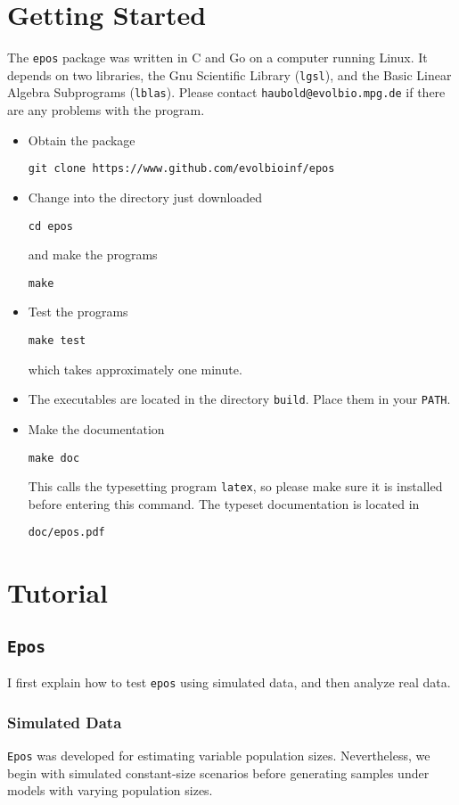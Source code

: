 \documentclass[a4paper, english]{article}
\newcommand{\bi}{\begin{itemize}}
\newcommand{\ei}{\end{itemize}}
\newcommand{\I}{\item}
\newcommand{\ty}{\texttt}
\begin{document}
\section{Getting Started}
The \ty{epos} package was written in C and Go on a computer running
Linux. It depends on
two libraries, the Gnu Scientific Library
(\ty{lgsl}), and the Basic Linear Algebra Subprograms (\ty{lblas}). 
Please contact \ty{haubold@evolbio.mpg.de} if there are any problems with the program.
\bi
\I Obtain the package
\begin{verbatim}
git clone https://www.github.com/evolbioinf/epos
\end{verbatim}
\I Change into the directory just downloaded
\begin{verbatim}
cd epos
\end{verbatim}
and make the programs
\begin{verbatim}
make
\end{verbatim}
\I Test the programs
\begin{verbatim}
make test
\end{verbatim}
which takes approximately one minute.
\I The executables are located in the
directory \ty{build}. Place them in your \ty{PATH}.
\I  Make the documentation
\begin{verbatim}
make doc
\end{verbatim}
This calls the typesetting program \ty{latex}, so please make sure it
is installed before entering this command. The typeset documentation is located
in
\begin{verbatim}
doc/epos.pdf
\end{verbatim}
\ei

\section{Tutorial}\label{sec:tut}
\subsection{\ty{Epos}}
I first explain how to test \ty{epos} using simulated data, and then
analyze real data.
\subsubsection*{Simulated Data}
\ty{Epos} was developed for estimating variable population
sizes. Nevertheless, we begin with simulated constant-size
scenarios before generating samples under models with varying population
sizes.
\end{document}

